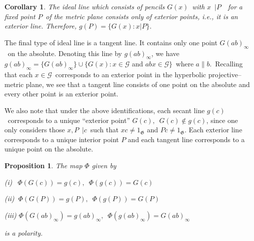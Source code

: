 \documentclass[a4paper,twoside,12pt]{article}
\newtheorem{prop}{Proposition}[section]
\newtheorem{cor}{Corollary}[section]
\begin{document}
\begin{cor} The ideal line which consists of pencils $G(x)$\
with $x$\ $|P$\ \ for a fixed point $P$\ of the metric plane consists only of
exterior points, {\it i.e.}, it is an exterior line. Therefore, 
$g(P)=\{G(x):x|P\}.$
\end{cor}

     The final type of ideal line is a tangent line. It contains only one 
point $G(ab)_{\infty }$\ on the absolute. Denoting this line by 
$g(ab)_{\infty }$, we have 
$g(ab)_{\infty }=\{G(ab)_{\infty }\}\cup \{G(x):x\in \mathcal{G}$ and $%
abx\in \mathcal{G}\}$\ where $a\parallel b.$\ Recalling that each $x\in 
\mathcal{G}$\ corresponds to an exterior point in the hyperbolic
projective--metric plane, we see that a tangent line consists of one point on
the absolute and every other point is an exterior point.

     We also note that under the above identifications, each secant line $%
g(c)$\ corresponds to a unique ``exterior point'' $G(c),$\ $G(c)\notin g(c)$,
since one only considers those $x,P$\ $|c$\ such that 
$xc\neq 1_{\mathfrak{G}}$ and $Pc\neq 1_{\mathfrak{G}}$. Each exterior line
corresponds to a unique interior point $P$ and each tangent line
corresponds to a unique point on the absolute.

\begin{prop} The map $\Phi$ given by

(i) $\ \ \Phi (G(c))=g(c),$\ $\Phi (g(c))=G(c)$

(ii) $\ \Phi (G(P))=g(P),$\ $\Phi (g(P))=G(P)$

(iii) $\Phi (G(ab)_{\infty })=g(ab)_{\infty },$\ $\Phi (g(ab)_{\infty
})=G(ab)_{\infty }$

is a polarity.
\end{prop}
\end{document}
